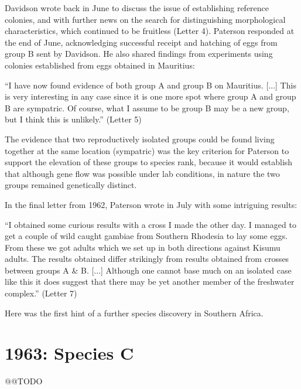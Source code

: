 \documentclass[a4paper,11pt,abstracton,hidelinks]{scrartcl}
\begin{document}
Davidson wrote back in June to discuss the issue of establishing reference colonies, and with further news on the search for distinguishing morphological characteristics, which continued to be fruitless (Letter 4).
%
Paterson responded at the end of June, acknowledging successful receipt and hatching of eggs from group B sent by Davidson.
%
He also shared findings from experiments using colonies established from eggs obtained in Mauritius:
\begin{displayquote}
``I have now found evidence of both group A and group B on Mauritius. [...] 
%
This is very interesting in any case since it is one more spot where group A and group B are sympatric.
%
Of course, what I assume to be group B may be a new group, but I think this is unlikely.'' (Letter 5)
\end{displayquote}
The evidence that two reproductively isolated groups could be found living together at the same location (sympatric) was the key criterion for Paterson to support the elevation of these groups to species rank, because it would establish that although gene flow was possible under lab conditions, in nature the two groups remained genetically distinct.


In the final letter from 1962, Paterson wrote in July with some intriguing results:
\begin{displayquote}
``I obtained some curious results with a cross I made the other day. I managed to get a couple of wild caught gambiae from Southern Rhodesia to lay some eggs. From these we got adults which we set up in both directions against Kisumu adults. The results obtained differ strikingly from results obtained from crosses between groups A \& B. [...] Although one cannot base much on an isolated case like this it does suggest that there may be yet another member of the freshwater complex.'' (Letter 7)
\end{displayquote}
%
Here was the first hint of a further species discovery in Southern Africa.


\section{1963: Species C}


@@TODO


\printbibliography
\end{document}
